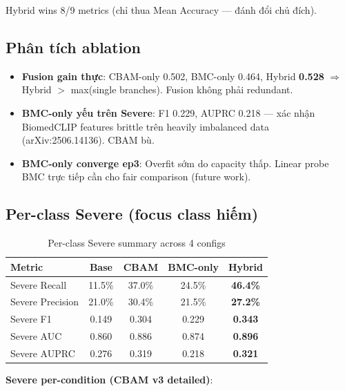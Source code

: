 \documentclass[11pt,a4paper]{article}
\newcommand{\best}[1]{\textcolor{best}{\textbf{#1}}}
\begin{document}
\noindent Hybrid wins 8/9 metrics (chỉ thua Mean Accuracy --- đánh đổi
chủ đích).

\subsection{Phân tích ablation}

\begin{itemize}[leftmargin=*]
\item \textbf{Fusion gain thực}: CBAM-only 0.502, BMC-only 0.464,
Hybrid \best{0.528} $\Rightarrow$ Hybrid $>$ max(single branches).
Fusion không phải redundant.
\item \textbf{BMC-only yếu trên Severe}: F1 0.229, AUPRC 0.218 ---
xác nhận BiomedCLIP features brittle trên heavily imbalanced data
(arXiv:2506.14136). CBAM bù.
\item \textbf{BMC-only converge ep3}: Overfit sớm do capacity thấp.
Linear probe BMC trực tiếp cần cho fair comparison (future work).
\end{itemize}

\subsection{Per-class Severe (focus class hiếm)}

\begin{table}[h]
\centering
\caption{Per-class Severe summary across 4 configs}
\begin{tabular}{@{}lcccc@{}}
\toprule
\rowcolor{tablehdr}
Metric & Base & CBAM & BMC-only & \best{Hybrid} \\
\midrule
Severe Recall    & 11.5\%   & 37.0\%   & 24.5\%   & \best{46.4\%} \\
Severe Precision & 21.0\%   & 30.4\%   & 21.5\%   & \best{27.2\%} \\
Severe F1        & 0.149    & 0.304    & 0.229    & \best{0.343} \\
Severe AUC       & 0.860    & 0.886    & 0.874    & \best{0.896} \\
Severe AUPRC     & 0.276    & 0.319    & 0.218    & \best{0.321} \\
\bottomrule
\end{tabular}
\end{table}

\noindent\textbf{Severe per-condition (CBAM v3 detailed)}:
\end{document}
